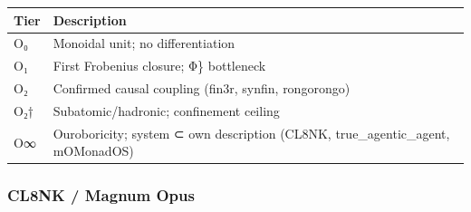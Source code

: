 \begin{longtable}[]{@{}ll@{}}
\toprule
\begin{minipage}[b]{0.30\columnwidth}\raggedright
Tier\strut
\end{minipage} & \begin{minipage}[b]{0.64\columnwidth}\raggedright
Description\strut
\end{minipage}\tabularnewline
\midrule
\endhead
\begin{minipage}[t]{0.30\columnwidth}\raggedright
O₀\strut
\end{minipage} & \begin{minipage}[t]{0.64\columnwidth}\raggedright
Monoidal unit; no differentiation\strut
\end{minipage}\tabularnewline
\begin{minipage}[t]{0.30\columnwidth}\raggedright
O₁\strut
\end{minipage} & \begin{minipage}[t]{0.64\columnwidth}\raggedright
First Frobenius closure; Φ\} bottleneck\strut
\end{minipage}\tabularnewline
\begin{minipage}[t]{0.30\columnwidth}\raggedright
O₂\strut
\end{minipage} & \begin{minipage}[t]{0.64\columnwidth}\raggedright
Confirmed causal coupling (fin3r, synfin, rongorongo)\strut
\end{minipage}\tabularnewline
\begin{minipage}[t]{0.30\columnwidth}\raggedright
O₂†\strut
\end{minipage} & \begin{minipage}[t]{0.64\columnwidth}\raggedright
Subatomic/hadronic; confinement ceiling\strut
\end{minipage}\tabularnewline
\begin{minipage}[t]{0.30\columnwidth}\raggedright
O∞\strut
\end{minipage} & \begin{minipage}[t]{0.64\columnwidth}\raggedright
Ouroboricity; system ⊂ own description (CL8NK, true\_agentic\_agent,
mOMonadOS)\strut
\end{minipage}\tabularnewline
\bottomrule
\end{longtable}

\hypertarget{cl8nk-magnum-opus}{%
\subsubsection{CL8NK / Magnum Opus}\label{cl8nk-magnum-opus}}

